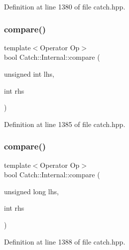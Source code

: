 Definition at line 1380 of file catch.\+hpp.

\hypertarget{namespace_catch_1_1_internal_a171aec1826898b877980a2b15fe5f735}{}\label{namespace_catch_1_1_internal_a171aec1826898b877980a2b15fe5f735} 
\subsubsection{\texorpdfstring{compare()}{compare()}\hspace{0.1cm}{\footnotesize\ttfamily [2/17]}}
{\footnotesize\ttfamily template$<$Operator Op$>$ \\
bool Catch\+::\+Internal\+::compare (\begin{DoxyParamCaption}\item[{unsigned int}]{lhs,  }\item[{int}]{rhs }\end{DoxyParamCaption})}



Definition at line 1385 of file catch.\+hpp.

\hypertarget{namespace_catch_1_1_internal_aa2698c33ec87b16aff5c844165483a7a}{}\label{namespace_catch_1_1_internal_aa2698c33ec87b16aff5c844165483a7a} 
\subsubsection{\texorpdfstring{compare()}{compare()}\hspace{0.1cm}{\footnotesize\ttfamily [3/17]}}
{\footnotesize\ttfamily template$<$Operator Op$>$ \\
bool Catch\+::\+Internal\+::compare (\begin{DoxyParamCaption}\item[{unsigned long}]{lhs,  }\item[{int}]{rhs }\end{DoxyParamCaption})}



Definition at line 1388 of file catch.\+hpp.

\hypertarget{namespace_catch_1_1_internal_ad68724393ee3d7629001a2997f6134cc}{}\label{namespace_catch_1_1_internal_ad68724393ee3d7629001a2997f6134cc} 
